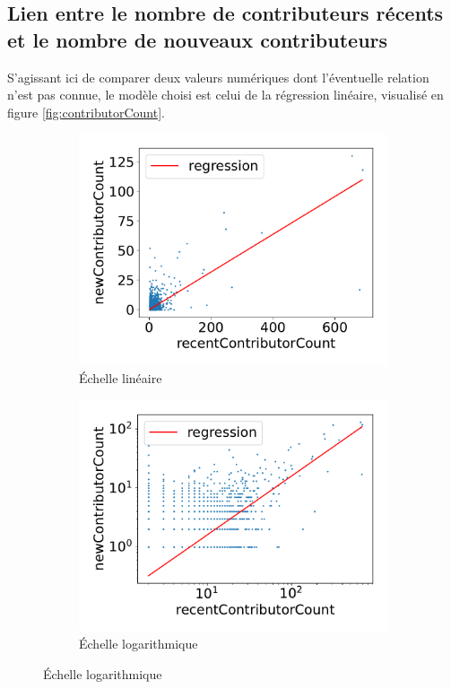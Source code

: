 \documentclass[dvipsnames]{llncs}
\begin{document}
    \subsection{Lien entre le nombre de contributeurs récents et le nombre de nouveaux contributeurs}

    S'agissant ici de comparer deux valeurs numériques dont l'éventuelle relation n'est pas connue, le modèle
    choisi est celui de la régression linéaire, visualisé en figure \ref{fig:contributorCount}.

    \begin{figure}
        \centering
        \begin{subfigure}[t]{0.5\textwidth}
            \includegraphics[width=\textwidth]{../experiment/data_analysis/recentContributorCountRegression_linearScale}
            \caption{Échelle linéaire}
        \end{subfigure}%
        \begin{subfigure}[t]{0.5\textwidth}
            \includegraphics[width=\textwidth]{../experiment/data_analysis/recentContributorCountRegression_logScale}
            \caption{Échelle logarithmique}
        \end{subfigure}


\end{figure}
\end{document}
